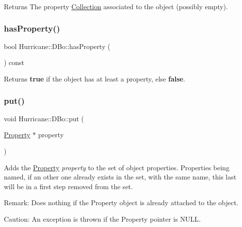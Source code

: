 \begin{DoxyReturn}{Returns}
The property \mbox{\hyperlink{classHurricane_1_1Collection}{Collection}} associated to the object (possibly empty). 
\end{DoxyReturn}
\mbox{\label{classHurricane_1_1DBo_a1563f094565030c77592ed82f9a9989b}} 
\subsubsection{\texorpdfstring{has\+Property()}{hasProperty()}}
{\footnotesize\ttfamily bool Hurricane\+::\+D\+Bo\+::has\+Property (\begin{DoxyParamCaption}{ }\end{DoxyParamCaption}) const\hspace{0.3cm}{\ttfamily [inline]}}

\begin{DoxyReturn}{Returns}
{\bfseries true} if the object has at least a property, else {\bfseries false}. 
\end{DoxyReturn}
\mbox{\label{classHurricane_1_1DBo_a8979674f11507cb4c7c5251b41ed72d5}} 
\subsubsection{\texorpdfstring{put()}{put()}}
{\footnotesize\ttfamily void Hurricane\+::\+D\+Bo\+::put (\begin{DoxyParamCaption}\item[{\mbox{\hyperlink{classHurricane_1_1Property}{Property}} $\ast$}]{property }\end{DoxyParamCaption})}

Adds the \mbox{\hyperlink{classHurricane_1_1Property}{Property}} {\itshape property} to the set of object properties. Properties being named, if an other one already exists in the set, with the same name, this last will be in a first step removed from the set.

\begin{DoxyParagraph}{Remark\+: Does nothing if the Property object is already attached to the}
object.
\end{DoxyParagraph}
\begin{DoxyParagraph}{Caution\+: An exception is thrown if the Property pointer is {\ttfamily N\+U\+LL}.}

\end{DoxyParagraph}
\mbox{\label{classHurricane_1_1DBo_a7833a1f0b8c704930bdc00861e63cf5e}} 
